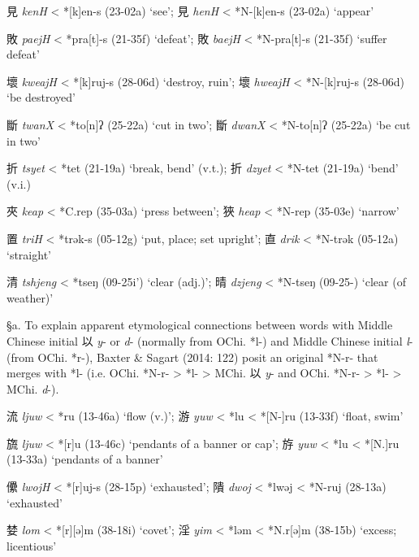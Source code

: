 \begin{description} \item
見  \emph{kenH }\textless{} *[k]{}en-s (23-02a) `see'; 見 \emph{henH}
\textless{} *N-{[}k]{}en-s (23-02a) `appear'
\item
敗  \emph{paejH} \textless{} *p{}ra{[}t]-s (21-35f) `defeat'; 敗
 \emph{baejH} \textless{} *N-p{}ra{[}t]-s (21-35f) `suffer defeat'
\item
壞  \emph{kweajH} \textless{} *[k]{}ruj-s (28-06d) `destroy, ruin'; 壞
 \emph{hweajH} \textless{} *N-{[}k]{}ruj-s (28-06d) `be destroyed'
\item
斷  \emph{twanX} \textless{} *t{}o[n]ʔ (25-22a) `cut in two'; 斷
 \emph{dwanX} \textless{} *N-t{}o[n]ʔ (25-22a) `be cut in two'
\item
折  \emph{tsyet} \textless{} *tet (21-19a) `break, bend' (v.t.); 折
 \emph{dzyet} \textless{} *N-tet (21-19a) `bend' (v.i.)
\item
夾  \emph{keap} \textless{} *C.{}rep (35-03a) `press between'; 狹
 \emph{heap} \textless{} *N-{}rep (35-03e) `narrow'
\item
置  \emph{triH} \textless{} *trək-s (05-12g) `put, place; set upright';
直 \emph{drik} \textless{} *N-trək (05-12a) `straight'
\item
清  \emph{tshjeng} \textless{} *ts{}eŋ (09-25i') `clear (adj.)'; 晴
 \emph{dzjeng} \textless{} *N-ts{}eŋ (09-25-) `clear (of weather)'
\end{description}

§a. To explain apparent etymological connections between words with
Middle Chinese initial 以  \emph{y}- or  \emph{d}- (normally from OChi.
*l-) and Middle Chinese initial \emph{l}- (from OChi. *r-), Baxter \&
Sagart (2014: 122) posit an original *N-r- that merges with *l- (i.e.
OChi. *N-r- \textgreater{} *l- \textgreater{} MChi. 以  \emph{y}- and
OChi. *N-r{}- \textgreater{} *l{}- \textgreater{} MChi.  \emph{d}-).

\begin{description} \item
流  \emph{ljuw} \textless{} *ru (13-46a) `flow (v.)'; 游 \emph{yuw}
\textless{} *lu \textless{} *[N-]ru (13-33f) `float, swim'
\item
旒  \emph{ljuw} \textless{} *[r]u (13-46c) `pendants of a banner or
cap'; 斿 \emph{yuw} \textless{} *lu \textless{} *[N.]ru (13-33a)
`pendants of a banner'
\item
儽  \emph{lwojH} \textless{} *[r]{}uj-s (28-15p) `exhausted'; 隤
 \emph{dwoj }\textless{} *l{}wəj \textless{} *N-r{}uj (28-13a) `exhausted'
\item
婪  \emph{lom} \textless{} *[r]{}{[}ə]m (38-18i) `covet'; 淫
 \emph{yim} \textless{} *ləm \textless{} *N.r{[}ə]m (38-15b) `excess;
licentious'
\end{description}

